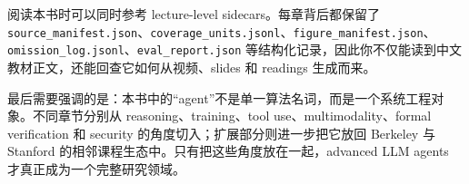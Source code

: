 阅读本书时可以同时参考 lecture-level sidecars。每章背后都保留了 \texttt{source\_manifest.json}、\texttt{coverage\_units.jsonl}、\texttt{figure\_manifest.json}、\texttt{omission\_log.jsonl}、\texttt{eval\_report.json} 等结构化记录，因此你不仅能读到中文教材正文，还能回查它如何从视频、slides 和 readings 生成而来。

最后需要强调的是：本书中的“agent”不是单一算法名词，而是一个系统工程对象。不同章节分别从 reasoning、training、tool use、multimodality、formal verification 和 security 的角度切入；扩展部分则进一步把它放回 Berkeley 与 Stanford 的相邻课程生态中。只有把这些角度放在一起，advanced LLM agents 才真正成为一个完整研究领域。

